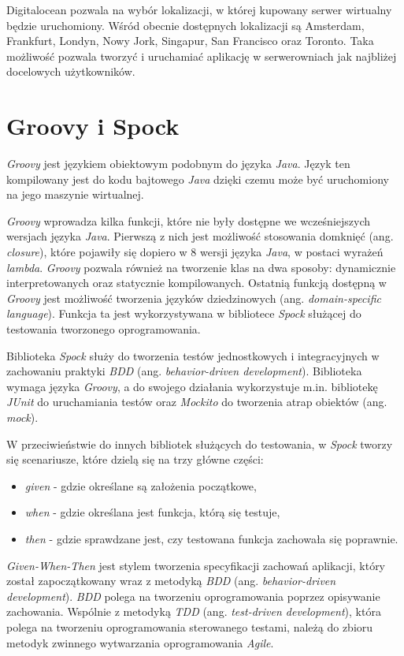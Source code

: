 Digitalocean pozwala na wybór lokalizacji, w której kupowany serwer wirtualny będzie uruchomiony. Wśród obecnie dostępnych lokalizacji są Amsterdam, Frankfurt, Londyn, Nowy Jork, Singapur, San Francisco oraz Toronto. Taka możliwość pozwala tworzyć i uruchamiać aplikację w serwerowniach jak najbliżej docelowych użytkowników. 

\section{Groovy i Spock} 
\label{groovy_and_spock}

\textsl{Groovy} jest językiem obiektowym podobnym do języka \textsl{Java}. Język ten kompilowany jest do kodu bajtowego \textsl{Java} dzięki czemu może być uruchomiony na jego maszynie wirtualnej. 

\textsl{Groovy} wprowadza kilka funkcji, które nie były dostępne we wcześniejszych wersjach języka \textsl{Java}. Pierwszą z nich jest możliwość stosowania domknięć (ang. \textsl{closure}), które pojawiły się dopiero w 8 wersji języka \textsl{Java}, w postaci wyrażeń \textsl{lambda}. \textsl{Groovy} pozwala również na tworzenie klas na dwa sposoby: dynamicznie interpretowanych oraz statycznie kompilowanych. Ostatnią funkcją dostępną w \textsl{Groovy} jest możliwość tworzenia języków dziedzinowych (ang. \textsl{domain-specific language}). Funkcja ta jest wykorzystywana w bibliotece \textsl{Spock} służącej do testowania tworzonego oprogramowania.

Biblioteka \textsl{Spock} służy do tworzenia testów jednostkowych i integracyjnych w zachowaniu praktyki \textsl{BDD} (ang. \textsl{behavior-driven development}). Biblioteka wymaga języka \textsl{Groovy}, a do swojego działania wykorzystuje m.in. bibliotekę \textsl{JUnit} do uruchamiania testów oraz \textsl{Mockito} do tworzenia atrap obiektów (ang. \textsl{mock}). 

W przeciwieństwie do innych bibliotek służących do testowania, w \textsl{Spock} tworzy się scenariusze, które dzielą się na trzy główne części: 
\begin{itemize}
    \item \textsl{given} - gdzie określane są założenia początkowe,
    \item \textsl{when} - gdzie określana jest funkcja, którą się testuje,
    \item \textsl{then} - gdzie sprawdzane jest, czy testowana funkcja zachowała się poprawnie.
\end{itemize}
\textsl{Given-When-Then} jest stylem tworzenia specyfikacji zachowań aplikacji, który został zapoczątkowany wraz z metodyką \textsl{BDD} (ang. \textsl{behavior-driven development}). \textsl{BDD} polega na tworzeniu oprogramowania poprzez opisywanie zachowania. Wspólnie z metodyką \textsl{TDD} (ang. \textsl{test-driven development}), która polega na tworzeniu oprogramowania sterowanego testami, należą do zbioru metodyk zwinnego wytwarzania oprogramowania \textsl{Agile}.